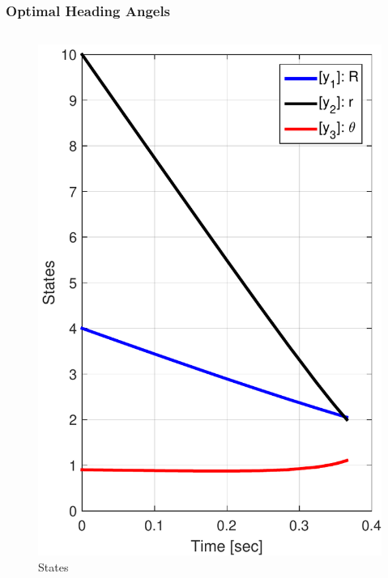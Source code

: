 \documentclass{beamer}
\begin{document}
\begin{frame}
\frametitle{Optimal Heading Angels}
\begin{columns}[c]
	\begin{column}{.3\linewidth}
		\begin{figure}[H]
			\centering
			\includegraphics[scale = 0.2]{fig/fig7a_paper.pdf}
			\caption{States}
		\end{figure}
	\end{column}


\end{columns}
\end{frame}
\end{document}
